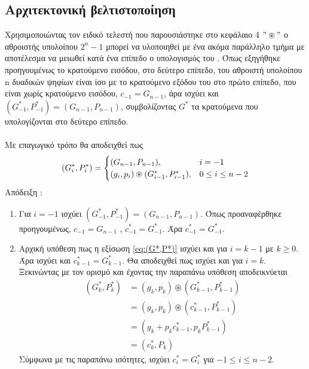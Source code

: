 \subsection{Αρχιτεκτονική βελτιστοποίηση}

Χρησιμοποιώντας τον ειδικό τελεστή που παρουσιάστηκε στο κεφάλαιο 4 $"\circledast"$
ο αθροιστής υπολοίπου $2^n-1$ μπορεί να υλοποιηθεί με ένα ακόμα παράλληλο τμήμα 
με αποτέλεσμα να μειωθεί κατά ένα επίπεδο ο υπολογισμός του \cite{863036}.
Όπως εξηγήθηκε προηγουμένως το κρατούμενο εισόδου, στο δεύτερο επίπεδο, του αθροιστή υπολοίπου n
δυαδικών ψηφίων είναι ίσο με το κρατούμενο εξόδου του στο πρώτο επίπεδο, που είναι 
χωρίς κρατούμενο εισόδου, $c_{-1} = G_{n-1}$, άρα ισχύει και 
$(G^*_{-1},P^*_{-1}) = (G_{n-1},P_{n-1})$, συμβολίζοντας $G^*$ τα κρατούμενα που υπολογίζονται 
στο δεύτερο επίπεδο.\\\\
Με επαγωγικό τρόπο θα αποδειχθεί πως
\begin{equation}
\label{eq:(G*,P*)}
\equationame{Εξίσωση κρατουμένων του $2^n-1$ αθροιστή}
    (G^*_i,P^*_i) =
    \begin{cases}
        (G_{n-1},P_{n-1}) ,& i = -1\\
        (g_i,p_i)\circledast(G^*_{i-1},P^*_{i-1}) ,& 0\leq i \leq n-2
    \end{cases}
\end{equation}
Απόδειξη :
\begin{enumerate}
    \item Για $i=-1$ ισχύει $(G^*_{-1},P^*_{-1}) = (G_{n-1},P_{n-1})$. Όπως προαναφέρθηκε προηγουμένως, $c_{-1} = G_{n-1}$ , $c^*_{-1} = G^*_{-1}$. Άρα $c^*_{-1} = G^*_{-1}$.
    \item Αρχική υπόθεση πως η εξίσωση \ref{eq:(G*,P*)} ισχύει και για $i=k-1$ με $k \geq 0$.
    Άρα ισχύει και $c^*_{k-1} = G^*_{k-1}$. Θα αποδειχθεί πως ισχύει και για $i=k$. Ξεκινώντας 
    με τον ορισμό και έχοντας την παραπάνω υπόθεση αποδεικνύεται 
    \begin{equation*}
    \begin{split}
        (G^*_k,P^*_k) &= (g_k,p_k) \circledast (G^*_{k-1},P^*_{k-1})\\
        &= (g_k,p_k) \circledast (c^*_{k-1},P^*_{k-1})\\
        &= (g_k + p_k c^*_{k-1} , p_k P^*_{k-1})\\
        &= (c^*_{k},P_k)
    \end{split}
    \end{equation*}
    Σύμφωνα με τις παραπάνω ισότητες, ισχύει $c^*_i = G^*_i$ για $-1 \leq i \leq n-2$.
\end{enumerate}

